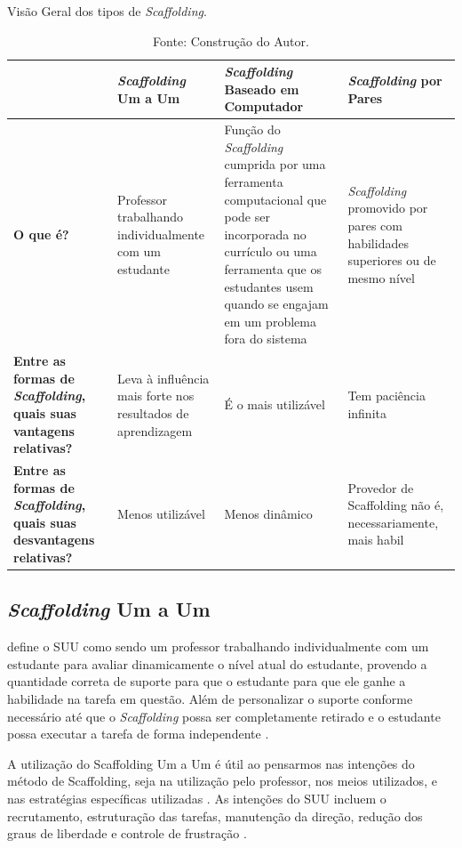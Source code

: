 \begin{table}[ht]
\caption{Visão Geral dos tipos de \textit{Scaffolding}.}
\label{tab:tipsScaf}
\begin{tabular}{p{82.80937pt}|p{114.4275pt}|p{112.921875pt}|p{113.67469pt}}
\hline
\textbf{} & \textbf{\textit{Scaffolding} Um a Um} & \textbf{\textit{Scaffolding} Baseado em Computador} & \textbf{\textit{Scaffolding} por Pares}\\ 
\hline
\textbf{O que é?} & Professor trabalhando individualmente com um estudante & Função do \textit{Scaffolding} cumprida por uma ferramenta computacional que pode ser incorporada no currículo ou uma ferramenta que os estudantes usem quando se engajam em um problema fora do sistema & \textit{Scaffolding} promovido por pares com habilidades superiores ou de mesmo nível\\ 
\hline
\textbf{Entre as formas de \textit{Scaffolding}, quais suas vantagens relativas?} & Leva à influência mais forte nos resultados de aprendizagem & É o mais utilizável & Tem paciência infinita\\ 
\hline
\textbf{Entre as formas de \textit{Scaffolding}, quais suas desvantagens relativas?} & Menos utilizável & Menos dinâmico & Provedor de Scaffolding não é, necessariamente, mais habil\\ 
\hline
\end{tabular}
\caption*{Fonte: Construção do Autor.}
\end{table}

\subsection{\textit{Scaffolding} Um a Um}

 define o SUU como sendo um professor trabalhando individualmente com um estudante para avaliar dinamicamente o nível atual do estudante, provendo a quantidade correta de suporte para que o estudante para que ele ganhe a habilidade na tarefa em questão. Além de personalizar o suporte conforme necessário até que o \textit{Scaffolding} possa ser completamente retirado e o estudante possa executar a tarefa de forma independente \cite{Chi1996,Graesser1997,Lepper1997,vanPol2010,Belland2014}.
 
A utilização do Scaffolding Um a Um é útil ao pensarmos nas intenções do método de Scaffolding, seja na utilização pelo professor, nos meios utilizados, e nas estratégias específicas utilizadas \cite{vanPol2010,Belland2012,Belland2017}. As intenções do SUU incluem o recrutamento, estruturação das tarefas, manutenção da direção, redução dos graus de liberdade e controle de frustração \cite{vanPol2010,Belland2017}.

